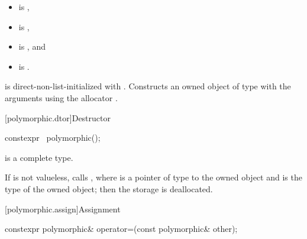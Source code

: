 \begin{itemdescr}
\pnum
\constraints

\begin{itemize}
\item
{} is ,
\item
{} is ,
\item
{} is , and
\item
{} is .
\end{itemize}

\pnum
\effects
{} is direct-non-list-initialized with .
Constructs an owned object of type  with the arguments
using the allocator .
\end{itemdescr}

[polymorphic.dtor]{Destructor}

%
\begin{itemdecl}
constexpr ~polymorphic();
\end{itemdecl}

\begin{itemdescr}
\pnum
\mandates
{} is a complete type.

\pnum
\effects
If  is not valueless,
calls ,
where  is a pointer of type  to
the owned object and
 is the type of the owned object;
then the storage is deallocated.
\end{itemdescr}

[polymorphic.assign]{Assignment}

%
%
\begin{itemdecl}
constexpr polymorphic& operator=(const polymorphic& other);
\end{itemdecl}

